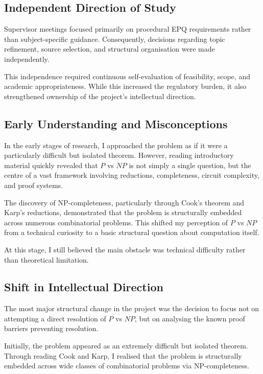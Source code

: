 \documentclass[12pt]{article}
\begin{document}
\subsection{Independent Direction of Study}

Supervisor meetings focused primarily on procedural EPQ requirements rather than subject-specific guidance. Consequently, decisions regarding topic refinement, source selection, and structural organisation were made independently.

This independence required continuous self-evaluation of feasibility, scope, and academic appropriateness. While this increased the regulatory burden, it also strengthened ownership of the project's intellectual direction.

\subsection{Early Understanding and Misconceptions}

In the early stages of research, I approached the problem as if it were a particularly difficult but isolated theorem. 
However, reading introductory material quickly revealed that $P$ vs $NP$ is not simply a single question, but the centre of a vast framework involving reductions, completeness, circuit complexity, and proof systems.

The discovery of NP-completeness, particularly through Cook's theorem and Karp's reductions, demonstrated that the problem is structurally embedded across numerous combinatorial problems. 
This shifted my perception of $P$ vs $NP$ from a technical curiosity to a basic structural question about computation itself.

At this stage, I still believed the main obstacle was technical difficulty rather than theoretical limitation.

\subsection{Shift in Intellectual Direction}

The most major structural change in the project was the decision to focus not on attempting a direct resolution of $P$ vs $NP$, but on analysing the known proof barriers preventing resolution.

Initially, the problem appeared as an extremely difficult but isolated theorem. Through reading Cook and Karp, I realised that the problem is structurally embedded across wide classes of combinatorial problems via NP-completeness.
\end{document}
